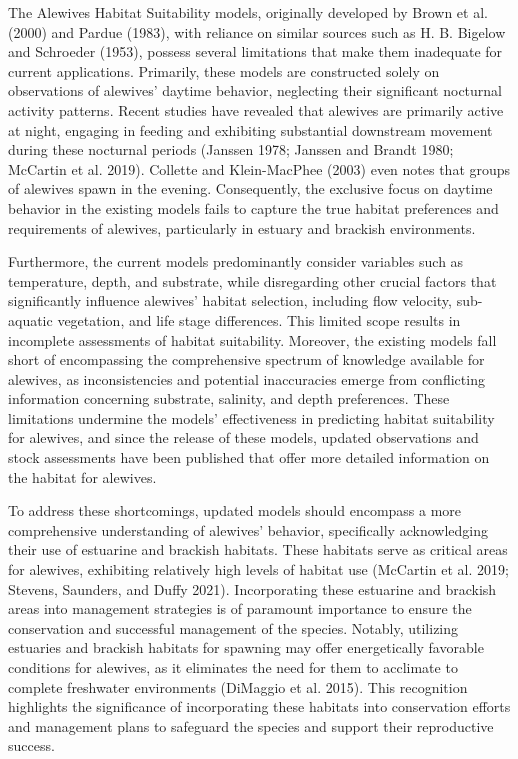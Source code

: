 \documentclass[
]{book}
\begin{document}
The Alewives Habitat Suitability models, originally developed by Brown et al. (2000) and Pardue (1983), with reliance on similar sources such as H. B. Bigelow and Schroeder (1953), possess several limitations that make them inadequate for current applications.
Primarily, these models are constructed solely on observations of alewives' daytime behavior, neglecting their significant nocturnal activity patterns.
Recent studies have revealed that alewives are primarily active at night, engaging in feeding and exhibiting substantial downstream movement during these nocturnal periods (Janssen 1978; Janssen and Brandt 1980; McCartin et al. 2019).
Collette and Klein-MacPhee (2003) even notes that groups of alewives spawn in the evening.
Consequently, the exclusive focus on daytime behavior in the existing models fails to capture the true habitat preferences and requirements of alewives, particularly in estuary and brackish environments.

Furthermore, the current models predominantly consider variables such as temperature, depth, and substrate, while disregarding other crucial factors that significantly influence alewives' habitat selection, including flow velocity, sub-aquatic vegetation, and life stage differences.
This limited scope results in incomplete assessments of habitat suitability.
Moreover, the existing models fall short of encompassing the comprehensive spectrum of knowledge available for alewives, as inconsistencies and potential inaccuracies emerge from conflicting information concerning substrate, salinity, and depth preferences.
These limitations undermine the models' effectiveness in predicting habitat suitability for alewives, and since the release of these models, updated observations and stock assessments have been published that offer more detailed information on the habitat for alewives.

To address these shortcomings, updated models should encompass a more comprehensive understanding of alewives' behavior, specifically acknowledging their use of estuarine and brackish habitats.
These habitats serve as critical areas for alewives, exhibiting relatively high levels of habitat use (McCartin et al. 2019; Stevens, Saunders, and Duffy 2021).
Incorporating these estuarine and brackish areas into management strategies is of paramount importance to ensure the conservation and successful management of the species.
Notably, utilizing estuaries and brackish habitats for spawning may offer energetically favorable conditions for alewives, as it eliminates the need for them to acclimate to complete freshwater environments (DiMaggio et al. 2015).
This recognition highlights the significance of incorporating these habitats into conservation efforts and management plans to safeguard the species and support their reproductive success.
\end{document}
